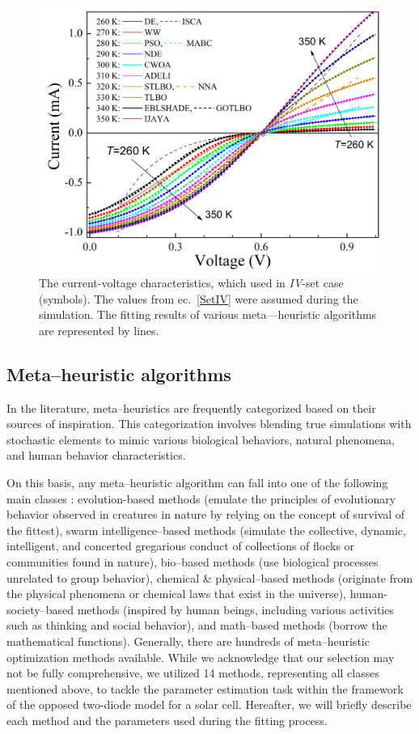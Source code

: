\documentclass[a4paper,fleqn]{cas-sc}
\begin{document}
\begin{figure}[]
	\centering
		\includegraphics[width=0.5\columnwidth]{Fig3}
	  \caption{The current-voltage characteristics, which used in \emph{IV}-set case (symbols).
        The values from ec.~\ref{SetIV} were assumed during the simulation.
        The fitting results of various meta---heuristic algorithms are represented by lines.}\label{figSetIV}
\end{figure}


\subsection{Meta--heuristic algorithms}\label{MHA}
In the literature, meta--heuristics are frequently categorized based on their sources of inspiration.
This categorization involves blending true simulations with stochastic elements
to mimic various biological behaviors, natural phenomena, and human behavior characteristics.

On this basis, any meta--heuristic algorithm can fall into one of the following main classes \cite{WhiteShark,Gannet,Dandelion}:
evolution-based methods (emulate the principles of evolutionary behavior observed in creatures in nature by relying on the concept of survival of the fittest),
swarm intelligence--based methods (simulate the collective, dynamic, intelligent, and concerted gregarious conduct of collections of flocks or communities found in nature),
bio--based methods (use biological processes unrelated to group behavior),
chemical \& physical--based methods (originate from the physical phenomena or chemical laws that exist in the universe),
human-society--based methods (inspired by human beings, including various activities such as thinking and social behavior),
and math--based methods (borrow the mathematical functions).
Generally, there are hundreds of meta--heuristic optimization methods available.
While we acknowledge that our selection may not be fully comprehensive,
we utilized 14 methods, representing all classes mentioned above,
to tackle the parameter estimation task within the framework of the opposed two-diode model for a solar cell.
Hereafter, we will briefly describe each method and the parameters used during the fitting process.
\end{document}
